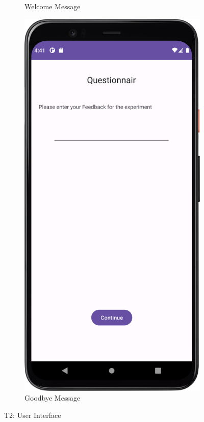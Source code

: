 \begin{figure}[htbp]
\begin{subfigure}[b]{0.25\textwidth}
        \caption{Welcome Message}
        \label{subfig:t2a}
    \end{subfigure}
    \hspace{1cm}
    \begin{subfigure}[b]{0.25\textwidth}
        \centering
        \includegraphics[width=\textwidth]{content/07_evaluation_of_the_solution/Screenshot_T2b.png}
        \caption{Goodbye Message}
        \label{subfig:t2b}
    \end{subfigure}
    \caption{T2: User Interface}
    \label{fig:T2}
\end{figure}


